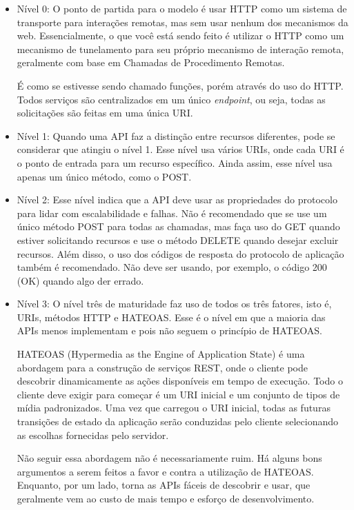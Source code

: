 \begin{itemize}
\item Nível 0: O ponto de partida para o modelo é usar HTTP como um sistema de transporte para interações remotas, mas sem usar nenhum dos mecanismos da web. Essencialmente, o que você está sendo feito é utilizar o HTTP como um mecanismo de tunelamento para seu próprio mecanismo de interação remota, geralmente com base em Chamadas de Procedimento Remotas. 

É como se estivesse sendo chamado funções, porém através do uso do HTTP. Todos serviços são centralizados em um único \textit{endpoint}, ou seja, todas as solicitações são feitas em uma única URI.

\item Nível 1: Quando uma API faz a distinção entre recursos diferentes, pode se considerar que atingiu o nível 1. Esse nível usa vários URIs, onde cada URI é o ponto de entrada para um recurso específico. Ainda assim, esse nível usa apenas um único método, como o POST.

\item Nível 2: Esse nível indica que a API deve usar as propriedades do protocolo para lidar com escalabilidade e falhas. Não é recomendado que se use um único método POST para todas as chamadas, mas faça uso do GET quando estiver solicitando recursos e use o método DELETE quando desejar excluir recursos. Além disso, o uso dos códigos de resposta do protocolo de aplicação também é recomendado. Não deve ser usando, por exemplo, o código 200 (OK) quando algo der errado.

\item Nível 3: O nível três de maturidade faz uso de todos os três fatores, isto é, URIs, métodos HTTP e HATEOAS. Esse é o nível em que a maioria das APIs menos implementam e pois não seguem o princípio de HATEOAS.

HATEOAS (Hypermedia as the Engine of Application State) é uma abordagem para a construção de serviços REST, onde o cliente pode descobrir dinamicamente as ações disponíveis em tempo de execução. Todo o cliente deve exigir para começar é um URI inicial e um conjunto de tipos de mídia padronizados. Uma vez que carregou o URI inicial, todas as futuras transições de estado da aplicação serão conduzidas pelo cliente selecionando as escolhas fornecidas pelo servidor.

Não seguir essa abordagem não é necessariamente ruim. Há alguns bons argumentos a serem feitos a favor e contra a utilização de HATEOAS. Enquanto, por um lado, torna as APIs fáceis de descobrir e usar, que geralmente vem ao custo de mais tempo e esforço de desenvolvimento.

\end{itemize}

